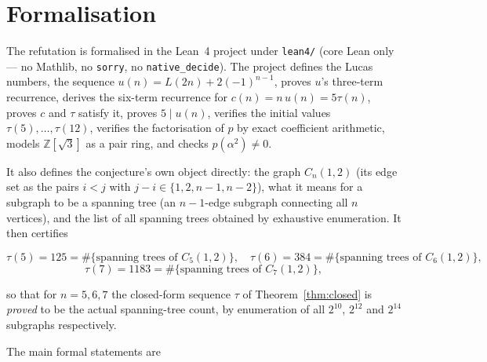 \documentclass[11pt]{article}
\theoremstyle{definition}
\theoremstyle{remark}
\newcommand{\Z}{\mathbb{Z}}
\newcommand{\tauc}{\tau}
\begin{document}
\section{Formalisation}

The refutation is formalised in the Lean~4 project under \texttt{lean4/}
(core Lean only --- no Mathlib, no \texttt{sorry}, no \texttt{native\_decide}).
The project defines the Lucas numbers, the sequence
$u(n) = L(2n)+2(-1)^{n-1}$, proves $u$'s three-term recurrence, derives the
six-term recurrence for $c(n) = n\,u(n) = 5\tauc(n)$, proves $c$ and $\tauc$
satisfy it, proves $5 \mid u(n)$, verifies the initial values
$\tauc(5),\dots,\tauc(12)$, verifies the factorisation of $p$ by exact
coefficient arithmetic, models $\Z[\sqrt3]$ as a pair ring, and checks
$p(\alpha^{2}) \neq 0$.

It also defines the conjecture's own object directly: the graph $C_n(1,2)$
(its edge set as the pairs $i<j$ with $j-i \in \{1,2,n-1,n-2\}$), what it means
for a subgraph to be a spanning tree (an $n-1$-edge subgraph connecting all $n$
vertices), and the list of all spanning trees obtained by exhaustive
enumeration.  It then certifies

\[
\tauc(5) = 125 = \#\{\text{spanning trees of } C_5(1,2)\},
\quad
\tauc(6) = 384 = \#\{\text{spanning trees of } C_6(1,2)\},
\]
\[
\tauc(7) = 1183 = \#\{\text{spanning trees of } C_7(1,2)\},
\]

so that for $n = 5,6,7$ the closed-form sequence $\tauc$ of
Theorem~\ref{thm:closed} is \emph{proved} to be the actual spanning-tree count,
by enumeration of all $2^{10}$, $2^{12}$ and $2^{14}$ subgraphs respectively.

The main formal statements are
\end{document}
